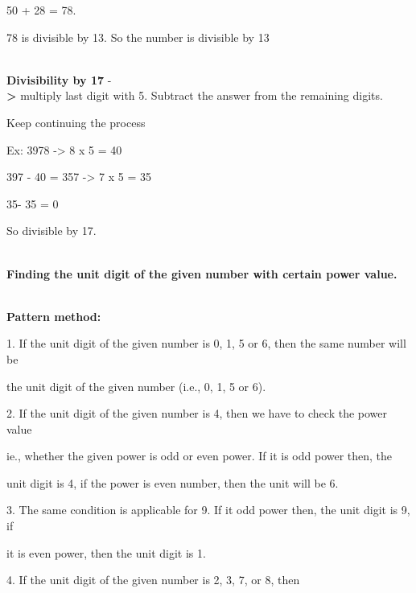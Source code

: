 \documentclass[
]{article}
\begin{document}
50 + 28 = 78.

78 is divisible by 13. So the number is divisible by 13


\textbf{\\ Divisibility by 17} -\textbf{\\ \textgreater{}} multiply last digit
with 5. Subtract the answer from the remaining digits.


Keep continuing the process

Ex: 3978 -\textgreater{} 8 x 5 = 40

397 - 40 = 357 -\textgreater{} 7 x 5 = 35

35- 35 = 0

So divisible by 17.

\textbf{\\ Finding the unit digit of the given number with certain power
value.}

\textbf{\\ Pattern method:}

1. If the unit digit of the given number is 0, 1, 5 or 6, then the same
number will be

the unit digit of the given number (i.e., 0, 1, 5 or 6).

2. If the unit digit of the given number is 4, then we have to check the
power value

ie., whether the given power is odd or even power. If it is odd power
then, the

unit digit is 4, if the power is even number, then the unit will be 6.

3. The same condition is applicable for 9. If it odd power then, the
unit digit is 9, if

it is even power, then the unit digit is 1.

4. If the unit digit of the given number is 2, 3, 7, or 8, then
\end{document}
